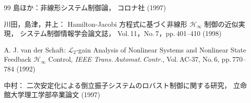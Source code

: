 

\begin{thebibliography}{99}
\label{cite:Shima1}
	島ほか：非線形システム制御論，
	コロナ社 (1997)

\label{cite:Kawata1}
	川田，島津，井上：
	Hamilton-Jacobi 方程式に基づく非線形 \(\mathcal{H}_{\infty}\) 制御の近似実現，
	システム制御情報学会論文誌，
	Vol.\,11，No.\,7，pp.\,401--410 (1998)

\label{cite:Schaft1}
	A. J. van der Schaft: 
	\(\mathcal{L}_{\textrm{2}}\)-gain Analysis of Nonlinear Systems and 
		Nonlinear State Feedback \(\mathcal{H}_{\infty}\) Control, 
	\textit{IEEE Trans.\,Automat.\,Contr.}, 
	Vol.\,AC-37, No.\,6, pp.\,770--784 (1992)

\label{cite:Nakamura1}
	中村：
	二次安定化による倒立振子システムのロバスト制御に関する研究，
	立命館大学理工学部卒業論文 (1997)

\end{thebibliography}

